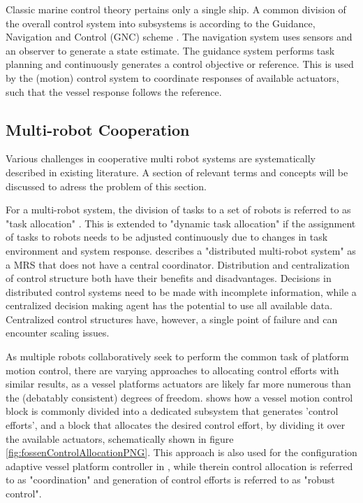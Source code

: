 Classic marine control theory pertains only a single ship. A common division of the overall control system into subsystems is according to the Guidance, Navigation and Control (GNC) scheme \cite{fossen2011handbook}. The navigation system uses sensors and an observer to generate a state estimate. The guidance system performs task planning and continuously generates a control objective or reference. This is used by the (motion) control system to coordinate responses of available actuators, such that the vessel response follows the reference. 

\subsection{Multi-robot Cooperation}
Various challenges in cooperative multi robot systems are systematically described in existing literature. A section of relevant terms and concepts will be discussed to adress the problem of this section. 

For a multi-robot system, the division of tasks to a set of robots is referred to as "task allocation" \citet{lerman2006analysis}. This is extended to "dynamic task allocation" if the assignment of tasks to robots needs to be adjusted continuously due to changes in task environment and system response. 
\citet{lerman2006analysis} describes a "distributed multi-robot system" as a MRS that does not have a central coordinator. Distribution and centralization of control structure both have their benefits and disadvantages. Decisions in distributed control systems need to be made with incomplete information, while a centralized decision making agent has the potential to use all available data. Centralized control structures have, however, a single point of failure and can encounter scaling issues. 

As multiple robots collaboratively seek to perform the common task of platform motion control, there are varying approaches to allocating control efforts with similar results, as a vessel platforms actuators are likely far more numerous than the (debatably consistent) degrees of freedom. \citet{fossen2011handbook} shows how a vessel motion control block is commonly divided into a dedicated subsystem that generates 'control efforts', and a block that allocates the desired control effort, by dividing it over the available actuators, schematically shown in figure \ref{fig:fossenControlAllocationPNG}. This approach is also used for the configuration adaptive vessel platform controller in \citet{park2019coordinated}, while therein control allocation is referred to as "coordination" and generation of control efforts is referred to as "robust control". 


